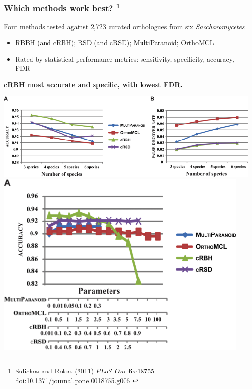 % 
\begin{frame}
  \frametitle{Which methods work best?
    \footnote{\tiny{Salichos and Rokas (2011) \textit{PLoS One} \textbf{6}:e18755 \href{http://dx.doi.org/10.1371/journal.pone.0018755.g006}{doi:10.1371/journal.pone.0018755.g006
  }}}
  }
  Four methods tested against 2,723 curated orthologues from six \textit{Saccharomycetes}
  \begin{itemize}
    \item \textcolor{hutton_green}{RBBH (and cRBH); RSD (and cRSD); MultiParanoid; OrthoMCL}
    \item \textcolor{hutton_blue}{Rated by statistical performance metrics: sensitivity, specificity, accuracy, FDR}
  \end{itemize}
  \textcolor{hutton_purple}{\textbf{cRBH most accurate and specific, with lowest FDR.}}
  \begin{center}
      \includegraphics[height=0.25\textheight]{images/salichos_results1} 
      \includegraphics[height=0.25\textheight]{images/salichos_results2}      
  \end{center}
\end{frame}

